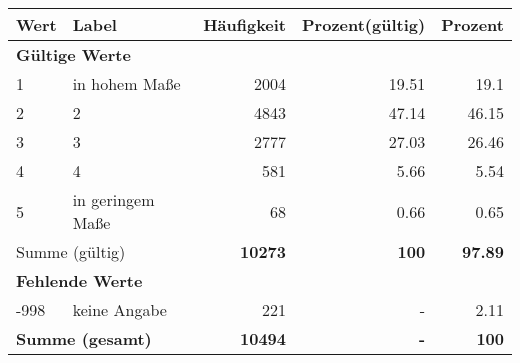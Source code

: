     \begin{longtable}{lXrrr}
     \toprule
     \textbf{Wert} & \textbf{Label} & \textbf{Häufigkeit} & \textbf{Prozent(gültig)} & \textbf{Prozent} \\
     \endhead
     \midrule
     \multicolumn{5}{l}{\textbf{Gültige Werte}}\\

     1 &
     \multicolumn{1}{X}{ in hohem Maße   } &


       \num{2004} &
       \num[round-mode=places,round-precision=2]{19.51} &
         \num[round-mode=places,round-precision=2]{19.1} \\

     2 &
     \multicolumn{1}{X}{ 2   } &


       \num{4843} &
       \num[round-mode=places,round-precision=2]{47.14} &
         \num[round-mode=places,round-precision=2]{46.15} \\

     3 &
     \multicolumn{1}{X}{ 3   } &


       \num{2777} &
       \num[round-mode=places,round-precision=2]{27.03} &
         \num[round-mode=places,round-precision=2]{26.46} \\

     4 &
     \multicolumn{1}{X}{ 4   } &


       \num{581} &
       \num[round-mode=places,round-precision=2]{5.66} &
         \num[round-mode=places,round-precision=2]{5.54} \\

     5 &
     \multicolumn{1}{X}{ in geringem Maße   } &


       \num{68} &
       \num[round-mode=places,round-precision=2]{0.66} &
         \num[round-mode=places,round-precision=2]{0.65} \\
     \midrule
     \multicolumn{2}{l}{Summe (gültig)} &
       \textbf{\num{10273}} &
     \textbf{\num{100}} &
       \textbf{\num[round-mode=places,round-precision=2]{97.89}} \\
     \multicolumn{5}{l}{\textbf{Fehlende Werte}}\\
       -998 &
       keine Angabe &
         \num{221} &
        - &
         \num[round-mode=places,round-precision=2]{2.11} \\
     \midrule
     \multicolumn{2}{l}{\textbf{Summe (gesamt)}} &
          \textbf{\num{10494}} &
        \textbf{-} &
        \textbf{\num{100}} \\
     \bottomrule
     \end{longtable}
     
